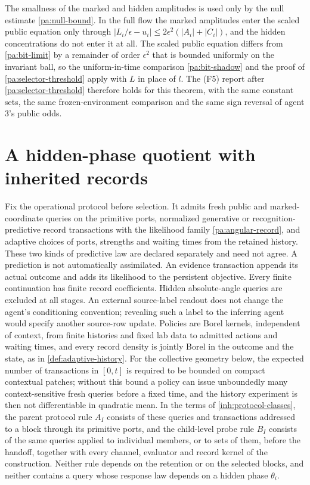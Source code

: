 The smallness of the marked and hidden amplitudes is used only by the null estimate \cref{pa:null-bound}. In the full flow the marked amplitudes enter the scaled public equation only through $|L_i/\epsilon-u_i|\leq2\epsilon^2(|A_i|+|C_i|)$, and the hidden concentrations do not enter it at all. The scaled public equation differs from \cref{pa:bit-limit} by a remainder of order $\epsilon^2$ that is bounded uniformly on the invariant ball, so the uniform-in-time comparison \cref{pa:bit-shadow} and the proof of \cref{pa:selector-threshold} apply with $L$ in place of $l$. The (F5) report after \cref{pa:selector-threshold} therefore holds for this theorem, with the same constant sets, the same frozen-environment comparison and the same sign reversal of agent $3$'s public odds.

\section{A hidden-phase quotient with inherited records}

Fix the operational protocol before selection. It admits fresh public and marked-coordinate queries on the primitive ports, normalized generative or recognition-predictive record transactions with the likelihood family \cref{pa:angular-record}, and adaptive choices of ports, strengths and waiting times from the retained history. These two kinds of predictive law are declared separately and need not agree. A prediction is not automatically assimilated. An evidence transaction appends its actual outcome and adds its likelihood to the persistent objective. Every finite continuation has finite record coefficients. Hidden absolute-angle queries are excluded at all stages. An external source-label readout does not change the agent's conditioning convention; revealing such a label to the inferring agent would specify another source-row update. Policies are Borel kernels, independent of context, from finite histories and fixed lab data to admitted actions and waiting times, and every record density is jointly Borel in the outcome and the state, as in \cref{def:adaptive-history}. For the collective geometry below, the expected number of transactions in $[0,t]$ is required to be bounded on compact contextual patches; without this bound a policy can issue unboundedly many context-sensitive fresh queries before a fixed time, and the history experiment is then not differentiable in quadratic mean. In the terms of \cref{inh:protocol-classes}, the parent protocol rule $A_I$ consists of these queries and transactions addressed to a block through its primitive ports, and the child-level probe rule $B_I$ consists of the same queries applied to individual members, or to sets of them, before the handoff, together with every channel, evaluator and record kernel of the construction. Neither rule depends on the retention or on the selected blocks, and neither contains a query whose response law depends on a hidden phase $\theta_i$.

